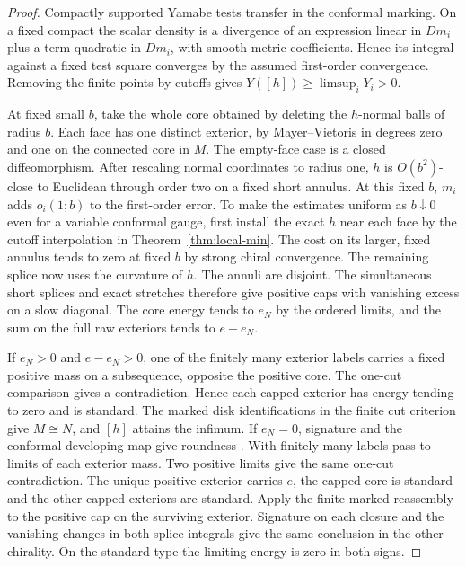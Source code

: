 \begin{proof}
Compactly supported Yamabe tests transfer in the conformal marking.
On a fixed compact the scalar density is a divergence of an expression
linear in \(Dm_i\) plus a term quadratic in \(Dm_i\), with smooth
metric coefficients. Hence its integral against a fixed test square
converges by the assumed first-order convergence. Removing the finite
points by cutoffs gives \(Y([h])\ge\limsup_iY_i>0\).

At fixed small \(b\), take the whole core obtained by deleting
the \(h\)-normal balls of radius \(b\). Each face has one distinct
exterior, by Mayer--Vietoris in degrees zero and one on the connected
core in \(M\). The empty-face case is a closed diffeomorphism.
After rescaling normal coordinates to radius one, \(h\) is
\(O(b^2)\)-close to Euclidean through order two on a fixed short
annulus. At this fixed \(b\), \(m_i\) adds \(o_i(1;b)\) to the
first-order error. To make the estimates uniform as \(b\downarrow0\)
even for a variable conformal gauge, first install the exact \(h\)
near each face by the cutoff interpolation in
Theorem~\ref{thm:local-min}. The cost on its larger, fixed annulus
tends to zero at fixed \(b\) by strong chiral convergence.
The remaining splice now uses the curvature of \(h\).
The annuli are disjoint. The simultaneous short splices and exact
stretches therefore give positive caps with vanishing excess on a
slow diagonal. The core energy tends to \(e_N\) by the ordered
limits, and the sum on the full raw exteriors tends to \(e-e_N\).

If \(e_N>0\) and \(e-e_N>0\), one of the finitely many exterior
labels carries a fixed positive mass on a subsequence, opposite the
positive core. The one-cut comparison gives a contradiction. Hence
each capped exterior has energy tending to zero and is standard.
The marked disk identifications in the finite cut criterion \cite[Finite cut criterion]{Baker2026ChiralMaster}
give \(M\cong N\), and \([h]\) attains the infimum.
If \(e_N=0\), signature and the conformal developing map give roundness \cite{Kuiper1949}.
With finitely many labels pass to limits of each exterior mass.
Two positive limits give the same one-cut contradiction. The
unique positive exterior carries \(e\), the capped core is standard
and the other capped exteriors are standard. Apply the finite marked
reassembly to the positive cap on the surviving exterior.
Signature on each closure and the vanishing changes in both splice
integrals give the same conclusion in the other chirality. On the
standard type the limiting energy is zero in both signs.
\end{proof}
